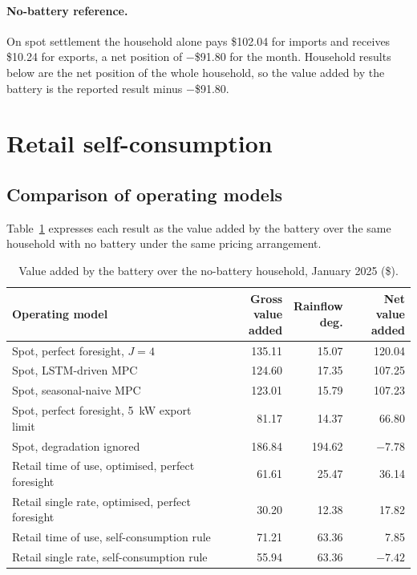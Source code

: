 \paragraph{No-battery reference.}
On spot settlement the household alone pays \$102.04 for imports and receives \$10.24 for
exports, a net position of $-$\$91.80 for the month. Household results below are the
net position of the whole household, so the value added by the battery is the reported
result minus $-$\$91.80.

\section{Retail self-consumption}
\subsection{Comparison of operating models}
\label{sec:results:comparison}

Table~\ref{tab:comparison} expresses each result as the value added by the battery over
the same household with no battery under the same pricing arrangement.

\begin{table}[htbp]
    \centering
    \small
    \caption{Value added by the battery over the no-battery household, January 2025 (\$).}
    \label{tab:comparison}
    \begin{tabular}{@{}lrrr@{}}
        \toprule
        Operating model & \shortstack{Gross value\\added} & \shortstack{Rainflow\\deg.} &
        \shortstack{Net value\\added} \\
        \midrule
        Spot, perfect foresight, $J=4$               & 135.11 & 15.07  & 120.04 \\
        Spot, LSTM-driven MPC                        & 124.60 & 17.35  & 107.25 \\
        Spot, seasonal-naive MPC                     & 123.01 & 15.79  & 107.23 \\
        Spot, perfect foresight, 5~kW export limit   & 81.17  & 14.37  & 66.80 \\
        Spot, degradation ignored                    & 186.84 & 194.62 & $-7.78$ \\
        \midrule
        Retail time of use, optimised, perfect foresight & 61.61 & 25.47 & 36.14 \\
        Retail single rate, optimised, perfect foresight & 30.20 & 12.38 & 17.82 \\
        Retail time of use, self-consumption rule    & 71.21  & 63.36  & 7.85 \\
        Retail single rate, self-consumption rule    & 55.94  & 63.36  & $-7.42$ \\
        \bottomrule
    \end{tabular}
\end{table}

